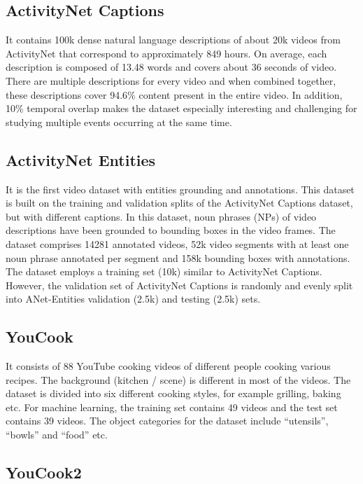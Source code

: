 \subsection{ActivityNet Captions}

\par It contains 100k dense natural language descriptions of about 20k videos from ActivityNet that correspond to approximately 849 hours. On average, each description is composed of 13.48 words and covers about 36 seconds of video. There are multiple descriptions for every video and when combined together, these descriptions cover 94.6\% content present in the entire video. In addition, 10\% temporal overlap makes the dataset especially interesting and challenging for studying multiple events occurring at the same time. 

\subsection{ActivityNet Entities}

\par It is the first video dataset with entities grounding and annotations. This dataset is built on the training and validation splits of the ActivityNet Captions dataset, but with different captions. In this dataset, noun phrases (NPs) of video descriptions have been grounded to bounding boxes in the video frames. The dataset comprises 14281 annotated videos, 52k video segments with at least one noun phrase annotated per segment and 158k bounding boxes with annotations. The dataset employs a training set (10k) similar to ActivityNet Captions. However, the validation set of ActivityNet Captions is randomly and evenly split into ANet-Entities validation (2.5k) and testing (2.5k) sets.

\subsection{YouCook}

\par It consists of 88 YouTube cooking videos of different people cooking various recipes. The background (kitchen / scene) is different in most of the videos. The dataset is divided into six different cooking styles, for example grilling, baking etc. For machine learning, the training set contains 49 videos and the test set contains 39 videos. The object categories for the dataset include “utensils”, “bowls” and “food” etc. 

\subsection{YouCook2}

